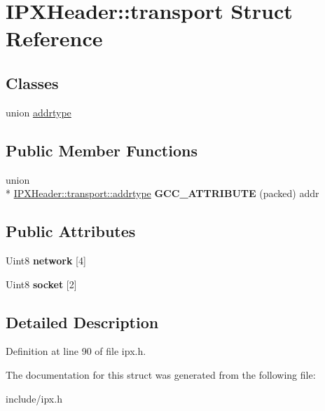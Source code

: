 \hypertarget{structIPXHeader_1_1transport}{\section{I\-P\-X\-Header\-:\-:transport Struct Reference}
\label{structIPXHeader_1_1transport}
}
\subsection*{Classes}
\begin{DoxyCompactItemize}
\item 
union \hyperlink{unionIPXHeader_1_1transport_1_1addrtype}{addrtype}
\end{DoxyCompactItemize}
\subsection*{Public Member Functions}
\begin{DoxyCompactItemize}
\item 
\hypertarget{structIPXHeader_1_1transport_a9e79bcd7a3e7a392fdee9ebdff74457b}{union \\*
\hyperlink{unionIPXHeader_1_1transport_1_1addrtype}{I\-P\-X\-Header\-::transport\-::addrtype} {\bfseries G\-C\-C\-\_\-\-A\-T\-T\-R\-I\-B\-U\-T\-E} (packed) addr}\label{structIPXHeader_1_1transport_a9e79bcd7a3e7a392fdee9ebdff74457b}

\end{DoxyCompactItemize}
\subsection*{Public Attributes}
\begin{DoxyCompactItemize}
\item 
\hypertarget{structIPXHeader_1_1transport_a4b35b2e0abeab77984dcb3a9f817b0ba}{Uint8 {\bfseries network} \mbox{[}4\mbox{]}}\label{structIPXHeader_1_1transport_a4b35b2e0abeab77984dcb3a9f817b0ba}

\item 
\hypertarget{structIPXHeader_1_1transport_abf9c4f8fd0a573254c914359a6c06691}{Uint8 {\bfseries socket} \mbox{[}2\mbox{]}}\label{structIPXHeader_1_1transport_abf9c4f8fd0a573254c914359a6c06691}

\end{DoxyCompactItemize}


\subsection{Detailed Description}


Definition at line 90 of file ipx.\-h.



The documentation for this struct was generated from the following file\-:\begin{DoxyCompactItemize}
\item 
include/ipx.\-h\end{DoxyCompactItemize}
